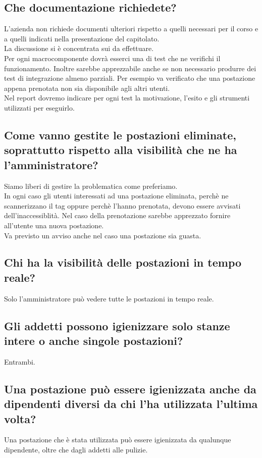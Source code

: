 \subsection*{Che documentazione richiedete?}
L'azienda non richiede documenti ulteriori rispetto a quelli necessari per il corso e a quelli indicati nella presentazione del capitolato.\\
La discussione si è concentrata sui  da effettuare.\\
Per ogni macrocomponente dovrà esserci una  di test che ne verifichi il funzionamento. Inoltre sarebbe apprezzabile anche se non necessario produrre dei test di integrazione almeno parziali. Per esempio va verificato che una postazione appena prenotata non sia disponibile agli altri utenti.\\
Nel report dovremo indicare per ogni test la motivazione, l'esito e gli strumenti utilizzati per eseguirlo.

\subsection*{Come vanno gestite le postazioni eliminate, soprattutto rispetto alla visibilità che ne ha l'amministratore?}
Siamo liberi di gestire la problematica come preferiamo.\\
In ogni caso gli utenti interessati ad una postazione eliminata, perchè ne scannerizzano il tag  oppure perchè l'hanno prenotata, devono essere avvisati dell'inaccessiblità. Nel caso della prenotazione sarebbe apprezzato fornire all'utente una nuova postazione.\\
Va previsto un avviso anche nel caso una postazione sia guasta.

\subsection*{Chi ha la visibilità delle postazioni in tempo reale?}
Solo l'amministratore può vedere tutte le postazioni in tempo reale.

\subsection*{Gli addetti possono igienizzare solo stanze intere o anche singole postazioni?}
Entrambi.

\subsection*{Una postazione può essere igienizzata anche da dipendenti diversi da chi l'ha utilizzata l'ultima volta?}
Una postazione che è stata utilizzata può essere igienizzata da qualunque dipendente, oltre che dagli addetti alle pulizie.

